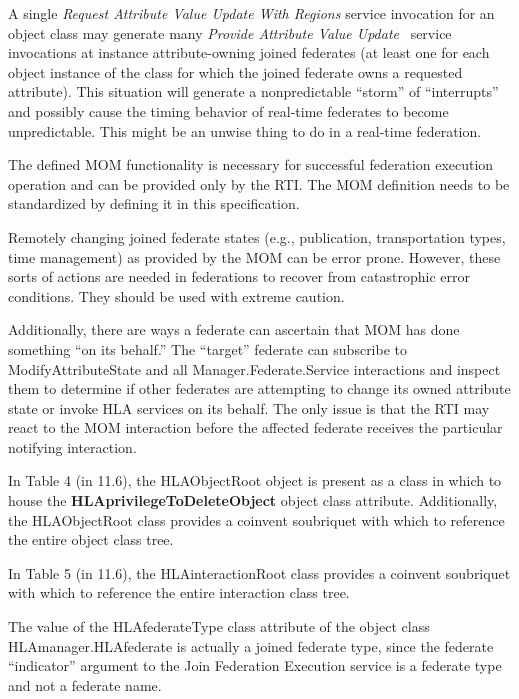 \begin{annexstdpage}
    A single \textit{Request Attribute Value Update With Regions} service invocation for an object class may generate many \textit{Provide Attribute Value Update} \rtiinitiated\ service invocations at instance attribute-owning joined federates (at least one for each object instance of the class for which the joined federate owns a requested attribute). This situation will generate a nonpredictable ``storm'' of ``interrupts'' and possibly cause the timing behavior of real-time federates to become unpredictable. This might be an unwise thing to do in a real-time federation.


    The defined MOM functionality is necessary for successful federation execution operation and can be provided only by the RTI. The MOM definition needs to be standardized by defining it in this specification.

    Remotely changing joined federate states (e.g., publication, transportation types, time management) as provided by the MOM can be error prone. However, these sorts of actions are needed in federations to recover from catastrophic error conditions. They should be used with extreme caution.

    Additionally, there are ways a federate can ascertain that MOM has done something ``on its behalf.'' The ``target'' federate can subscribe to ModifyAttributeState and all Manager.Federate.Service interactions and inspect them to determine if other federates are attempting to change its owned attribute state or invoke HLA services on its behalf. The only issue is that the RTI may react to the MOM interaction before the affected federate receives the particular notifying interaction.
\end{annexstdpage}

\clearpage

\begin{annexstdpage}

    In Table 4 (in 11.6), the HLAObjectRoot object is present as a class in which to house the \textbf{HLAprivilegeToDeleteObject} object class attribute. Additionally, the HLAObjectRoot class provides a coinvent soubriquet with which to reference the entire object class tree.

    In Table 5 (in 11.6), the HLAinteractionRoot class provides a coinvent soubriquet with which to reference the entire interaction class tree.

    The value of the HLAfederateType class attribute of the object class HLAmanager.HLAfederate is actually a joined federate type, since the federate ``indicator'' argument to the Join Federation Execution service is a federate type and not a federate name.
\end{annexstdpage}
